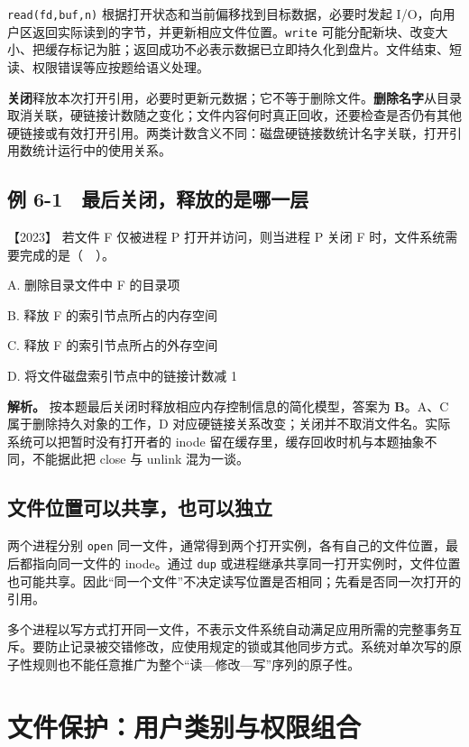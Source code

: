 \allowbreak{}\texttt{read(fd,}\allowbreak{}\texttt{buf,}\allowbreak{}\texttt{n)} 根据打开状态和当前偏移找到目标数据，必要时发起 I/O，向用户区返回实际读到的字节，并更新相应文件位置。\allowbreak{}\texttt{write} 可能分配新块、改变大小、把缓存标记为脏；返回成功不必表示数据已立即持久化到盘片。文件结束、短读、权限错误等应按题给语义处理。

\textbf{关闭}释放本次打开引用，必要时更新元数据；它不等于删除文件。\textbf{删除名字}从目录取消关联，硬链接计数随之变化；文件内容何时真正回收，还要检查是否仍有其他硬链接或有效打开引用。两类计数含义不同：磁盘硬链接数统计名字关联，打开引用数统计运行中的使用关系。

\subsection{例 6-1　最后关闭，释放的是哪一层}\label{os-ex6-1}

\noindent{}【2023】 若文件 F 仅被进程 P 打开并访问，则当进程 P 关闭 F 时，文件系统需要完成的是（　）。

A. 删除目录文件中 F 的目录项

B. 释放 F 的索引节点所占的内存空间

C. 释放 F 的索引节点所占的外存空间

D. 将文件磁盘索引节点中的链接计数减 1


\textbf{解析。} 按本题最后关闭时释放相应内存控制信息的简化模型，答案为 \textbf{B}。A、C 属于删除持久对象的工作，D 对应硬链接关系改变；关闭并不取消文件名。实际系统可以把暂时没有打开者的 inode 留在缓存里，缓存回收时机与本题抽象不同，不能据此把 close 与 unlink 混为一谈。

\subsection{文件位置可以共享，也可以独立}\label{os-c06-h41}

两个进程分别 \allowbreak{}\texttt{open} 同一文件，通常得到两个打开实例，各有自己的文件位置，最后都指向同一文件的 inode。通过 \allowbreak{}\texttt{dup} 或进程继承共享同一打开实例时，文件位置也可能共享。因此``同一个文件''不决定读写位置是否相同；先看是否同一次打开的引用。

多个进程以写方式打开同一文件，不表示文件系统自动满足应用所需的完整事务互斥。要防止记录被交错修改，应使用规定的锁或其他同步方式。系统对单次写的原子性规则也不能任意推广为整个``读---修改---写''序列的原子性。

\section{文件保护：用户类别与权限组合}\label{os-6-3}

